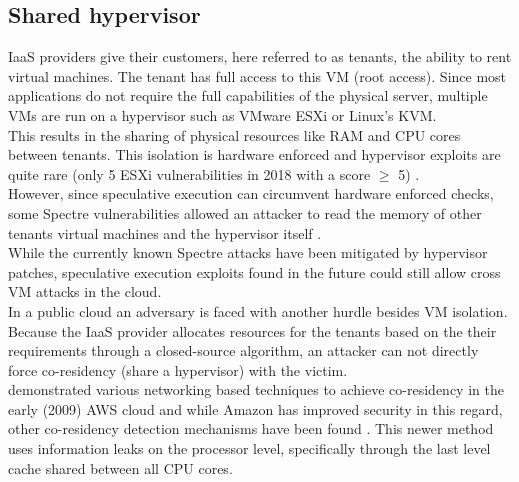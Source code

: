 \documentclass[conference,compsoc,final,a4paper]{IEEEtran}
\begin{document}
\subsection{Shared hypervisor}
\ac{IaaS} providers give their customers, here referred to as tenants, the ability to rent virtual machines. The tenant has full access
to this VM (root access). Since most applications do not require the full capabilities of the physical server, multiple VMs are run on a hypervisor such as VMware
ESXi or Linux's KVM. \\
This results in the sharing of physical resources like RAM and CPU cores between tenants. This isolation is hardware enforced and hypervisor exploits are quite rare (only 5 ESXi vulnerabilities in 2018 with a score $\ge$ 5) \cite{esxiVulnerabilities}. \\
However, since speculative execution can circumvent hardware enforced checks, some Spectre vulnerabilities allowed an attacker to read the memory of other tenants virtual machines and the hypervisor itself \cite{vmwareSpectre, vmwareSpectreNG}. \\
While the currently known Spectre attacks have been mitigated by hypervisor patches, speculative execution exploits found in the future could still allow cross VM attacks in the cloud. \\
In a public cloud an adversary is faced with another hurdle besides VM isolation. Because the \ac{IaaS} provider allocates resources for the tenants based on the their requirements through a closed-source algorithm, an attacker can not directly force co-residency (share a hypervisor) with the victim. \\
\textcite{Ristenpart:2009:HYG:1653662.1653687} demonstrated various networking based techniques to achieve co-residency in the early (2009) \ac{AWS} cloud and while Amazon has improved security in this regard, other co-residency detection mechanisms have been found \cite{inci2015seriously}. This newer method uses information leaks on the processor level, specifically through the last level cache shared between all CPU cores.
\end{document}
